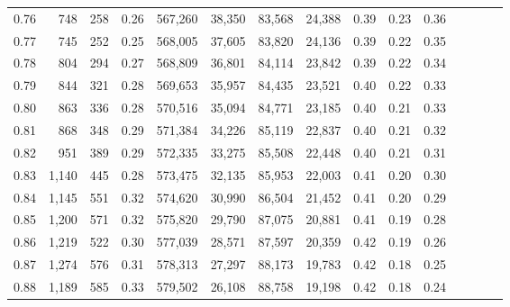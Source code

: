 \begin{tabular}{rrrcrrrrrrrrrrr}
0.76 &     748 &     258 &                                       0.26 &  567,260 &   38,350 &   83,568 &   24,388 &  0.39 &  0.23 &                         0.36 \\
0.77 &     745 &     252 &                                       0.25 &  568,005 &   37,605 &   83,820 &   24,136 &  0.39 &  0.22 &                         0.35 \\
0.78 &     804 &     294 &                                       0.27 &  568,809 &   36,801 &   84,114 &   23,842 &  0.39 &  0.22 &                         0.34 \\
0.79 &     844 &     321 &                                       0.28 &  569,653 &   35,957 &   84,435 &   23,521 &  0.40 &  0.22 &                         0.33 \\
0.80 &     863 &     336 &                                       0.28 &  570,516 &   35,094 &   84,771 &   23,185 &  0.40 &  0.21 &                         0.33 \\
0.81 &     868 &     348 &                                       0.29 &  571,384 &   34,226 &   85,119 &   22,837 &  0.40 &  0.21 &                         0.32 \\
0.82 &     951 &     389 &                                       0.29 &  572,335 &   33,275 &   85,508 &   22,448 &  0.40 &  0.21 &                         0.31 \\
0.83 &   1,140 &     445 &                                       0.28 &  573,475 &   32,135 &   85,953 &   22,003 &  0.41 &  0.20 &                         0.30 \\
0.84 &   1,145 &     551 &                                       0.32 &  574,620 &   30,990 &   86,504 &   21,452 &  0.41 &  0.20 &                         0.29 \\
0.85 &   1,200 &     571 &                                       0.32 &  575,820 &   29,790 &   87,075 &   20,881 &  0.41 &  0.19 &                         0.28 \\
0.86 &   1,219 &     522 &                                       0.30 &  577,039 &   28,571 &   87,597 &   20,359 &  0.42 &  0.19 &                         0.26 \\
0.87 &   1,274 &     576 &                                       0.31 &  578,313 &   27,297 &   88,173 &   19,783 &  0.42 &  0.18 &                         0.25 \\
0.88 &   1,189 &     585 &                                       0.33 &  579,502 &   26,108 &   88,758 &   19,198 &  0.42 &  0.18 &                         0.24 \\

\end{tabular}
